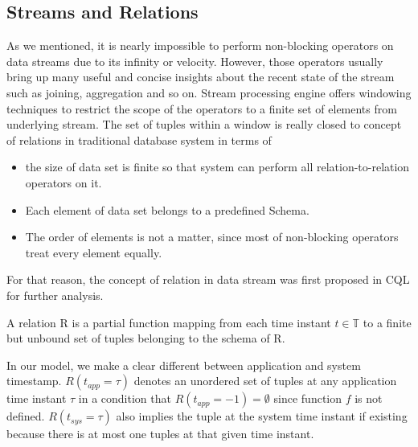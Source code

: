 \subsection*{Streams and Relations}
As we mentioned, it is nearly impossible to perform non-blocking operators on data streams due to its infinity or velocity. However, those operators usually bring up many useful and concise insights about the recent state of the stream such as joining, aggregation and so on. Stream processing engine offers windowing techniques to restrict the scope of the operators to a finite set of elements from underlying stream. The set of tuples within a window is really closed to concept of relations in traditional database system in terms of 
\begin{itemize}
	\item the size of data set is finite so that system can perform all relation-to-relation operators on it.
	\item Each element of data set belongs to a predefined Schema.
	\item The order of elements is not a matter, since most of non-blocking operators treat every element equally. 
\end{itemize} 

For that reason, the concept of relation in data stream was first proposed in CQL \citep{Arasu:2006} for further analysis. 

\begin{defi}
	A relation R is a partial function mapping from each time instant $t \in \mathbb{T}$ to a finite but unbound set of tuples belonging to the schema of R.
\end{defi}

In our model, we make a clear different between application and system timestamp. $R(t_{app} = \tau)$ denotes an unordered set of tuples at any application time instant $\tau$ in a condition that $R(t_{app} = -1) = \emptyset$ since function $f$ is not defined. $R(t_{sys} = \tau)$ also implies the tuple at the system time instant if existing because there is at most one tuples at that given time instant. 

